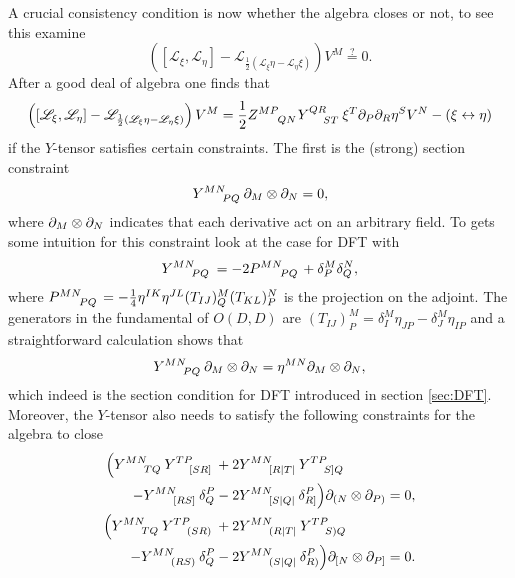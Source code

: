 A crucial consistency condition is now whether the algebra closes or not, to see this examine 
\begin{equation}\label{eq:closure}
    \left(\left[\mathscr{L}_\xi,\mathscr{L}_\eta\right]-\mathscr{L}_{\frac{1}{2}\left(\mathscr{L}_\xi\eta-\mathscr{L}_\eta\xi\right)}\right)V^M\overset{?}{=}0.
\end{equation}
After a good deal of algebra one finds that 
\begin{equation}\label{eq:GenDiffComm}
    \left(\left[\mathscr{L}_\xi,\mathscr{L}_\eta\right]-\mathscr{L}_{\frac{1}{2}\left(\mathscr{L}_\xi\eta-\mathscr{L}_\eta\xi\right)}\right)V^M = \frac{1}{2}\tensor{Z}{^{MP}_{QN}}\tensor{Y}{^{QR}_{ST}}\xi^T\pd_P\pd_R\eta^SV^N-\left(\xi\leftrightarrow\eta\right)
\end{equation}
if the $Y$-tensor satisfies certain constraints. The first is the (strong) section constraint 
\begin{equation}
    \tensor{Y}{^{MN}_{PQ}}\pd_M\otimes\pd_N = 0,
\end{equation}
where $\partial_M\otimes\partial_N$ indicates that each derivative act on an arbitrary field. To gets some intuition for this constraint look at the case for DFT with
\begin{equation}
    \tensor{Y}{^{MN}_{PQ}}=-2\tensor{P}{^{MN}_{PQ}}+\delta^M_P\delta^N_Q,
\end{equation}
where $\tensor{P}{^{MN}_{PQ}}=-\frac{1}{4}\eta^{IK}\eta^{JL}(T_{IJ})^M_Q(T_{KL})^N_P$ is the projection on the adjoint. The generators in the fundamental of $O(D,D)$ \cite{Berman2014} are $(T_{IJ})^M_P=\delta^M_I\eta_{JP}-\delta_J^M\eta_{IP}$ and a straightforward calculation shows that 
\begin{equation}\label{eq:section}
    \tensor{Y}{^{MN}_{PQ}}\pd_M\otimes\pd_N = \eta^{MN}\pd_M\otimes\pd_N,
\end{equation}
which indeed is the section condition for DFT introduced in section \ref{sec:DFT}. Moreover, the $Y$-tensor also needs to satisfy the following constraints for the algebra to close
\begin{subequations}
    \begin{align}
        \begin{split}
        \Big(\tensor{Y}{^{MN}_{TQ}}\tensor{Y}{^{TP}_{[SR]}}&+2\tensor{Y}{^{MN}_{[R|T|}}\tensor{Y}{^{TP}_{S]Q}}\\
        -\tensor{Y}{^{MN}_{[RS]}}\delta^P_Q&-2\tensor{Y}{^{MN}_{[S|Q|}}\delta_{R]}^P\Big)\pd_{(N}\otimes\pd_{P)}=0,
        \end{split}\label{eq:closure1}
        \\
        \begin{split}
        \Big(\tensor{Y}{^{MN}_{TQ}}\tensor{Y}{^{TP}_{(SR)}}&+2\tensor{Y}{^{MN}_{(R|T|}}\tensor{Y}{^{TP}_{S)Q}}\\
        -\tensor{Y}{^{MN}_{(RS)}}\delta^P_Q&-2\tensor{Y}{^{MN}_{(S|Q|}}\delta_{R)}^P\Big)\pd_{[N}\otimes\pd_{P]}=0.
        \end{split}\label{eq:closure2}
    \end{align}
    \end{subequations}

